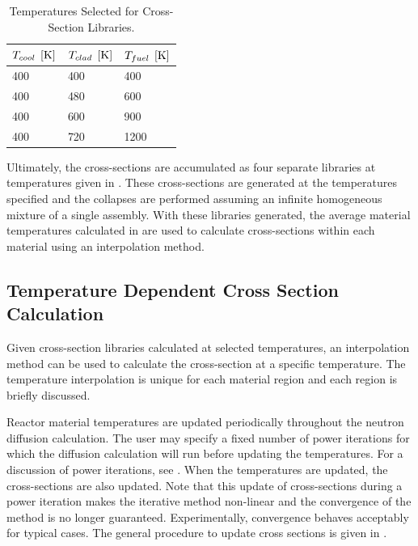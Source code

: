     \begin{table}
      \caption{Temperatures Selected for Cross-Section Libraries.}
      \label{tab:xstemps}
      \begin{center}
        \begin{tabular}{lll}
          \toprule
          $T_{cool} \;\left[\text{{K}}\right]$ & $T_{clad} \;\left[\text{{K}}\right]$ & $T_{fuel} \;\left[\text{{K}}\right]$ \\
          \midrule
          400 & 400 & 400  \\
          400 & 480 & 600  \\
          400 & 600 & 900  \\
          400 & 720 & 1200 \\
          \bottomrule
        \end{tabular}
      \end{center}
    \end{table}

    Ultimately, the cross-sections are accumulated as four separate libraries at
    temperatures given in . These cross-sections are generated
    at the temperatures specified and the collapses are performed assuming an
    infinite homogeneous mixture of a single assembly. With these libraries
    generated, the average material temperatures calculated in 
     are used to calculate cross-sections within each
    material using an interpolation method.

  \subsection{Temperature Dependent Cross Section Calculation}
    Given cross-section libraries calculated at selected temperatures, an
    interpolation method can be used to calculate the cross-section at a 
    specific temperature.  The temperature interpolation is unique for each 
    material region and each region is briefly discussed.

    Reactor material temperatures are updated periodically throughout the 
    neutron diffusion calculation. The user may specify a fixed number of power
    iterations for which the diffusion calculation will run before updating the
    temperatures.
    For a discussion of power iterations, see . When
    the temperatures are updated, the cross-sections are also updated. Note that
    this update of cross-sections during a power iteration makes the iterative
    method non-linear and the convergence of the method is no longer guaranteed.
    Experimentally, convergence behaves acceptably for typical cases. The
    general procedure to update cross sections is given in
    .

